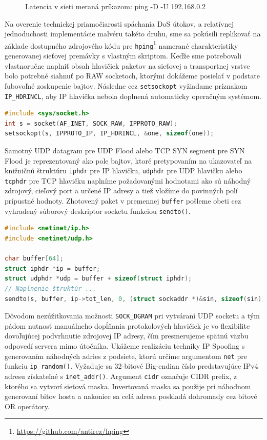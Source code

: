\documentclass[12pt, a4paper]{article}
\begin{document}
\begin{figure}[h!]
\begin{subfigure}[t]{.32\textwidth}
	\end{subfigure}
	\caption{Latencia v sieti meraná príkazom: ping -D -U 192.168.0.2}
	\label{latency-graphs}
\end{figure}

Na overenie technickej priamočiarosti spáchania DoS útokov, a relatívnej jednoduchosti
implementácie malvéru takéto druhu, sme sa pokúsili replikovať na základe dostupného zdrojového
kódu pre \verb|hping|\footnote{\url{https://github.com/antirez/hping}} namerané charakteristiky 
generovanej sieťovej premávky s vlastným skriptom. Keďže sme potrebovali vlastnoručne naplniť obsah hlavičiek
paketov na sieťovej a transportnej vrstve bolo potrebné siahnuť po RAW socketoch, ktorými dokážeme posielať
v podstate ľubovoľné zoskupenie bajtov. Následne cez \verb|setsockopt| vyžiadame príznakom \verb|IP_HDRINCL|,
aby IP hlavička nebola doplnená automaticky operačným systémom.

\begin{lstlisting}[caption=Otvorenie RAW Socket bez dopĺňania IP hlavičky, language=C]
#include <sys/socket.h>
int s = socket(AF_INET, SOCK_RAW, IPPROTO_RAW);
setsockopt(s, IPPROTO_IP, IP_HDRINCL, &one, sizeof(one));
\end{lstlisting}

Samotný UDP datagram pre UDP Flood alebo TCP SYN segment pre SYN Flood je reprezentovaný ako pole
bajtov, ktoré pretypovaním na ukazovateľ na knižničnú štruktúru \verb|iphdr| pre IP hlavičku, \verb|udphdr| 
pre UDP hlavičku alebo \verb|tcphdr| pre TCP hlavičku naplníme požadovanými hodnotami ako sú náhodný zdrojový, 
cieľový port a určené IP adresy a tiež vložíme do povinných polí prípustné hodnoty. Zhotovený paket
v premennej \verb|buffer| pošleme obeti cez vyhradený súborový deskriptor socketu funkciou \verb|sendto()|.

\begin{lstlisting}[caption=Poslanie UDP datagramov cez RAW Socket na Linuxe, language=C]
#include <netinet/ip.h>
#include <netinet/udp.h>

char buffer[64];
struct iphdr *ip = buffer;
struct udphdr *udp = buffer + sizeof(struct iphdr);
// Naplnenie štruktúr ...
sendto(s, buffer, ip->tot_len, 0, (struct sockaddr *)&sin, sizeof(sin));
\end{lstlisting}

Dôvodom nezúžitkovania možnosti \verb|SOCK_DGRAM| pri vytváraní UDP socketu a tým pádom nutnosť
manuálneho dopĺňania protokolových hlavičiek je vo flexibilite dovoľujúcej podvrhnutie zdrojovej
IP adresy, čím presmerujeme spätnú väzbu odpovedí servera mimo útočníka. Ukážeme realizáciu 
techniky IP Spoofing s generovaním náhodných adries z podsiete, ktorú určíme argumentom \verb|net|
pre funkciu \verb|ip_random()|. Vyžaduje sa 32-bitové Big-endian číslo predstavujúce IPv4 adresu
získateľné s \verb|inet_addr()|. Argument \verb|cidr| označuje CIDR prefix, z ktorého sa vytvorí
sieťová maska. Invertovaná maska sa použije pri náhodnom generovaní bitov hosta a nakoniec sa
celá adresa poskladá dohromady cez bitové OR operátory.
\end{document}
